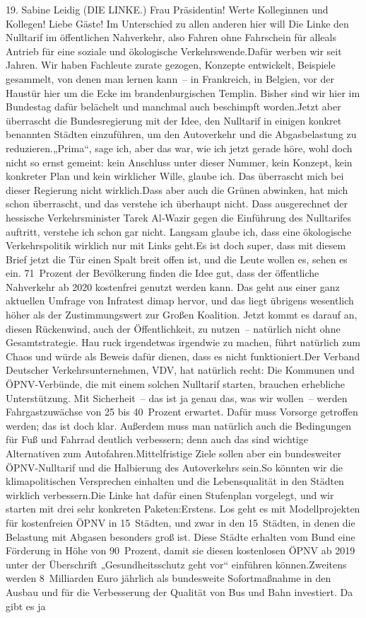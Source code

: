 \documentclass{article}
\begin{document}
	19. Sabine Leidig (DIE LINKE.) Frau Präsidentin! Werte Kolleginnen und Kollegen! Liebe Gäste! Im Unterschied zu allen anderen hier will Die Linke den Nulltarif im öffentlichen Nahverkehr, also Fahren ohne Fahrschein für alleals Antrieb für eine soziale und ökologische Verkehrswende.Dafür werben wir seit Jahren. Wir haben Fachleute zurate gezogen, Konzepte entwickelt, Beispiele gesammelt, von denen man lernen kann – in Frankreich, in Belgien, vor der Haustür hier um die Ecke im brandenburgischen Templin. Bisher sind wir hier im Bundestag dafür belächelt und manchmal auch beschimpft worden.Jetzt aber überrascht die Bundesregierung mit der Idee, den Nulltarif in einigen konkret benannten Städten einzuführen, um den Autoverkehr und die Abgasbelastung zu reduzieren.„Prima“, sage ich, aber das war, wie ich jetzt gerade höre, wohl doch nicht so ernst gemeint: kein Anschluss unter dieser Nummer, kein Konzept, kein konkreter Plan und kein wirklicher Wille, glaube ich. Das überrascht mich bei dieser Regierung nicht wirklich.Dass aber auch die Grünen abwinken, hat mich schon überrascht, und das verstehe ich überhaupt nicht. Dass ausgerechnet der hessische Verkehrsminister Tarek Al‑Wazir gegen die Einführung des Nulltarifes auftritt, verstehe ich schon gar nicht. Langsam glaube ich, dass eine ökologische Verkehrspolitik wirklich nur mit Links geht.Es ist doch super, dass mit diesem Brief jetzt die Tür einen Spalt breit offen ist, und die Leute wollen es, sehen es ein. 71 Prozent der Bevölkerung finden die Idee gut, dass der öffentliche Nahverkehr ab 2020 kostenfrei genutzt werden kann. Das geht aus einer ganz aktuellen Umfrage von Infratest dimap hervor, und das liegt übrigens wesentlich höher als der Zustimmungswert zur Großen Koalition. Jetzt kommt es darauf an, diesen Rückenwind, auch der Öffentlichkeit, zu nutzen – natürlich nicht ohne Gesamtstrategie. Hau ruck irgendetwas irgendwie zu machen, führt natürlich zum Chaos und würde als Beweis dafür dienen, dass es nicht funktioniert.Der Verband Deutscher Verkehrsunternehmen, VDV, hat natürlich recht: Die Kommunen und ÖPNV-Verbünde, die mit einem solchen Nulltarif starten, brauchen erhebliche Unterstützung. Mit Sicherheit – das ist ja genau das, was wir wollen – werden Fahrgastzuwächse von 25 bis 40 Prozent erwartet. Dafür muss Vorsorge getroffen werden; das ist doch klar. Außerdem muss man natürlich auch die Bedingungen für Fuß und Fahrrad deutlich verbessern; denn auch das sind wichtige Alternativen zum Autofahren.Mittelfristige Ziele sollen aber ein bundesweiter ÖPNV-­Nulltarif und die Halbierung des Autoverkehrs sein.So könnten wir die klimapolitischen Versprechen einhalten und die Lebensqualität in den Städten wirklich verbessern.Die Linke hat dafür einen Stufenplan vorgelegt, und wir starten mit drei sehr konkreten Paketen:Erstens. Los geht es mit Modellprojekten für kostenfreien ÖPNV in 15 Städten, und zwar in den 15 Städten, in denen die Belastung mit Abgasen besonders groß ist. Diese Städte erhalten vom Bund eine Förderung in Höhe von 90 Prozent, damit sie diesen kostenlosen ÖPNV ab 2019 unter der Überschrift „Gesundheitsschutz geht vor“ einführen können.Zweitens werden 8 Milliarden Euro jährlich als bundesweite Sofortmaßnahme in den Ausbau und für die Verbesserung der Qualität von Bus und Bahn investiert. Da gibt es ja 
\end{document}
